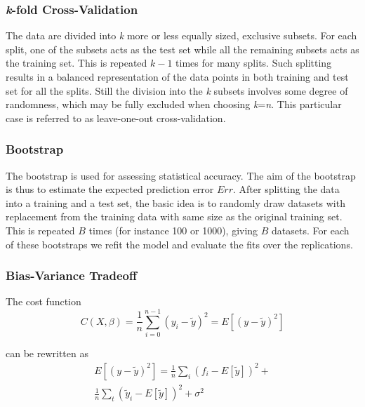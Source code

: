 \documentclass[a4paper,11pt,twocolumn]{article}
\begin{document}
\subsubsection{\textit{k}-fold Cross-Validation}
 
The data are divided into \textit{k} more or less equally sized, exclusive subsets. For each split, one of the subsets acts as the test set while all the remaining subsets acts as the training set. This is repeated $\textit{k}-1$ times for many splits. Such splitting results in a balanced representation of the data points in both training and test set for all the splits. Still the division into the \textit{k} subsets involves some degree of randomness, which may be fully excluded when choosing \textit{k}=\textit{n}. This particular case is referred to as leave-one-out cross-validation. 

\subsubsection{Bootstrap}

The bootstrap is used for assessing statistical accuracy. The aim of the bootstrap is thus to estimate the expected prediction error $Err$. After splitting the data into a training and a test set, the basic idea is to randomly draw datasets with replacement from the training data with same size as the original training set. This is repeated $\textit{B}$ times (for instance 100 or 1000), giving $\textit{B}$ datasets. For each of these bootstraps we refit the model and evaluate the fits over the replications.\cite{Hastie}  


\subsubsection{Bias-Variance Tradeoff}

The cost function 
\begin{equation}
C(X,\beta)=\frac{1}{n}\sum\limits_{i=0}^{n-1}(y_i-\tilde{y})^2=E[(y-\tilde{y})^2]
\end{equation}

can be rewritten as 
\begin{equation}
\begin{multlined}
E[(y-\tilde{y})^2]=\frac{1}{n}\sum\limits_i(f_i-E[\tilde{y}])^2+\\ \frac{1}{n}\sum\limits_t(\tilde{y}_i-E[\tilde{y}])^2+\sigma^2
\end{multlined}
\end{equation}
\end{document}
